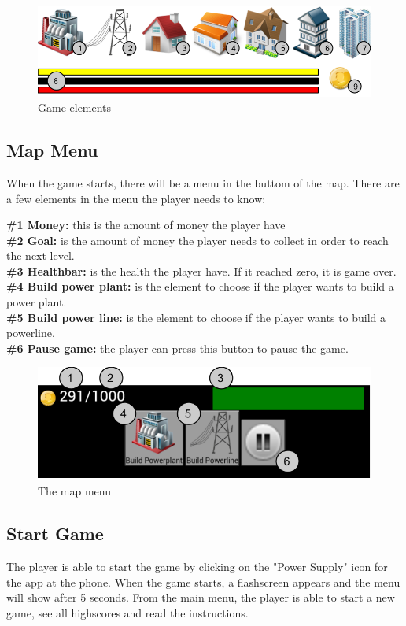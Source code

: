 	\begin{figure}[H]
		\includegraphics[width=\textwidth]{pictures/GameElements.png}
		\caption{Game elements}
	\end{figure}

\subsection*{Map Menu}
	When the game starts, there will be a menu in the buttom of the map. There 
	are a few elements in the menu the player needs to know:

	{\bf \#1 Money: } this is the amount of money the player have\\
	{\bf \#2 Goal: } is the amount of money the player needs to collect in 
	order to reach the next level.\\
	{\bf \#3 Healthbar: } is the health the player have. If it reached zero, it is game over. \\
	{\bf \#4 Build power plant: } is the element to choose if the player wants to build a power plant. \\
	{\bf \#5 Build power line: } is the element to choose if the player wants to build a powerline. \\
	{\bf \#6 Pause game: } the player can press this button to pause the game. \\

	\begin{figure}[H]
		\includegraphics[width=\textwidth]{pictures/mapmenu.png}
		\caption{The map menu}
	\end{figure}

\subsection*{Start Game}
	The player is able to start the game by clicking on the "Power Supply" icon
	for the app at the phone. When the game starts, a flashscreen appears and the
	menu will show after 5 seconds. From the main menu, the player is able to 
	start a new game, see all highscores and read the instructions. 

